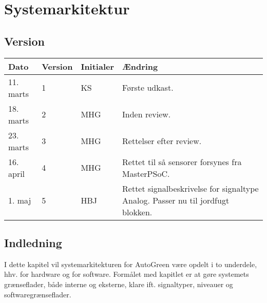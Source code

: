 \chapter{Systemarkitektur} \label{ch:SysArk}

\section{Version}
\begin{table}[h]
	\centering
	\begin{tabularx}{\textwidth - 2cm}{|l|l|l|X|}
	\hline
	Dato	& Version	& Initialer & Ændring	\\ \hline
	11. marts & 1 & KS & Første udkast. \\ \hline
	18. marts & 2 & MHG & Inden review. \\\hline
	23. marts & 3 & MHG & Rettelser efter review. \\\hline		
	16. april & 4 & MHG & Rettet til så \IIC sensorer forsynes fra MasterPSoC. \\\hline 
	1. maj & 5 & HBJ & Rettet signalbeskrivelse for signaltype Analog. Passer nu til jordfugt blokken. \\\hline
	\end{tabularx}
\end{table}

\section{Indledning}

I dette kapitel vil systemarkitekturen for AutoGreen være opdelt i to underdele, hhv. for hardware og for software. Formålet med kapitlet er at gøre systemets grænseflader, både interne og eksterne, klare ift. signaltyper, niveauer og softwaregrænseflader.







